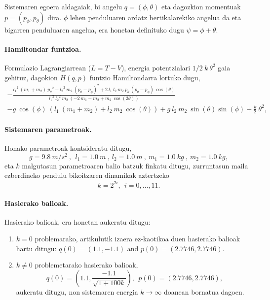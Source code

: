 Sistemaren egoera aldagaiak, bi angelu $q=(\phi,\theta)$ eta dagozkion momentuak $p=(p_{\phi},p_{\theta})$ dira.  $\phi$ lehen penduluaren ardatz bertikalarekiko angelua da eta bigarren penduluaren angelua, era honetan definituko dugu  $\psi=\phi+\theta$.

\paragraph*{Hamiltondar funtzioa.} 
Formulazio Lagrangiarrean ($L=T-V$), energia potentzialari $1/2 \ k \ \theta^2$ gaia gehituz, dagokion $H(q,p)$ funtzio Hamiltondarra lortuko dugu,
\begin{multline}
\label{eq:Hpb2}
-\frac{ {l_1}^2 \ (m_1+m_2) \ {p_{\theta}}^2 +{l_2}^2 \ m_2 \ (p_{\theta} -p_{\phi})^2 + 2 \ l_1 \ l_2 \ m_2 \ p_{\theta} \ (p_{\theta} -p_{\phi}) \  \cos(\theta )} {{l_1}^2  \ {l_2}^2 \ m_2 \  (-2 \ m_1 - m_2 + m_2 \ \cos(2 \theta ))} \\
-g  \ \cos (\phi) \  (l_1 \ (m_1+m_2)+l_2 \ m_2 \ \cos(\theta))+g \ l_2 \ m_2 \ \sin(\theta) \sin(\phi)+\frac{k}{2} \ \theta^2 ,
\end{multline}

\paragraph*{Sistemaren parametroak.} 
Honako parametroak kontsideratu ditugu,
\begin{equation*} \label{eq:17}
g=9.8 \ {m}/{s^2}\ ,\ \ l_1=1.0 \ m \ , \ l_2=1.0 \ m\ , \ m_1=1.0 \ kg\ , \ m_2=1.0 \ kg,
\end{equation*} 
eta $k$ malgutasun parametroaren balio batzuk finkatu ditugu, zurruntasun maila ezberdineko pendulu bikoitzaren dinamikak aztertzeko 
\begin{equation*}
k=2^{2i}, \ \ i=0,\dots,11.
\end{equation*}  

\paragraph*{Hasierako balioak.}
Hasierako balioak, era honetan aukeratu ditugu:
\begin{enumerate}
\item  $k=0$ problemarako, \cite{Dumitru} artikulutik izaera ez-kaotikoa duen hasierako balioak hartu ditugu: $q(0)=(1.1, -1.1)$ and $p(0)=(2.7746,2.7746)$.

\item  $k\neq 0$ problemetarako hasierako balioak,
\begin{equation*}
q(0)=\left(1.1, \frac{-1.1}{\sqrt{1+100k}}\right), \ \ 
p(0)=(2.7746,2.7746),
\end{equation*}
aukeratu ditugu, non sistemaren energia $k \rightarrow \infty$ doanean bornatua dagoen.

\end{enumerate}


